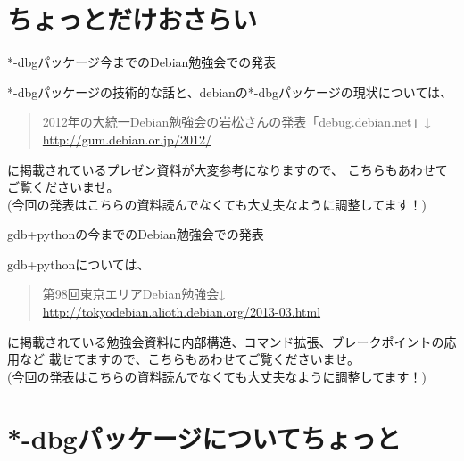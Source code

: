 \section{ちょっとだけおさらい}

\begin{frame}{*-dbgパッケージ今までのDebian勉強会での発表}

 *-dbgパッケージの技術的な話と、debianの*-dbgパッケージの現状については、
\begin{quote}
2012年の大統一Debian勉強会の岩松さんの発表「debug.debian.net」↓
\url{http://gum.debian.or.jp/2012/}
\end{quote}

に掲載されているプレゼン資料が大変参考になりますので、
こちらもあわせてご覧くださいませ。\\
(今回の発表はこちらの資料読んでなくても大丈夫なように調整してます！)
\end{frame}

\begin{frame}{gdb+pythonの今までのDebian勉強会での発表}

 gdb+pythonについては、

\begin{quote}
第98回東京エリアDebian勉強会↓
\url{http://tokyodebian.alioth.debian.org/2013-03.html}
\end{quote}

に掲載されている勉強会資料に内部構造、コマンド拡張、ブレークポイントの応用など
載せてますので、こちらもあわせてご覧くださいませ。\\
(今回の発表はこちらの資料読んでなくても大丈夫なように調整してます！)

\end{frame}

\section{*-dbgパッケージについてちょっと}

